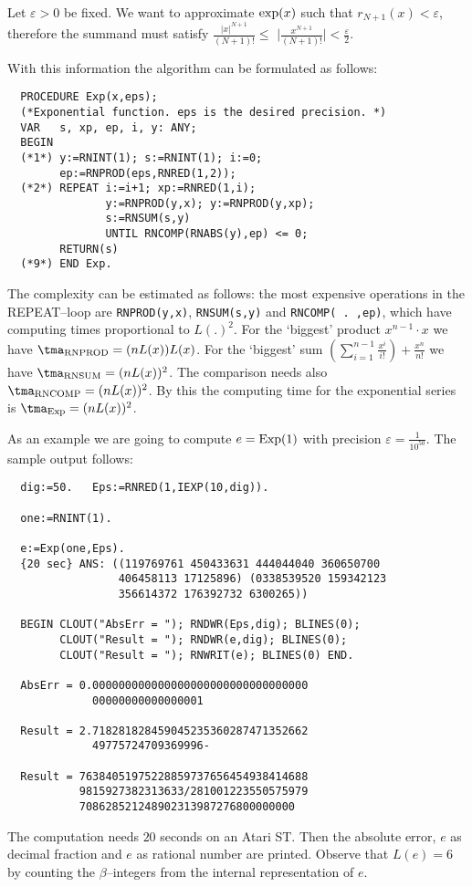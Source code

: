 Let $\varepsilon > 0$ be fixed. We want to approximate 
${\rm exp}(x)$ such that $r_{N+1}(x) < \varepsilon$, therefore the
summand must satisfy 
$\frac{\vert x \vert^{N+1}}{(N+1) !} \leq $
$\vert \frac{x^{N+1}}{(N+1) !} \vert < \frac{\varepsilon}{2}$.

With this information the algorithm can be formulated as follows:

\begin{verbatim}
  PROCEDURE Exp(x,eps);
  (*Exponential function. eps is the desired precision. *)
  VAR   s, xp, ep, i, y: ANY;
  BEGIN 
  (*1*) y:=RNINT(1); s:=RNINT(1); i:=0; 
        ep:=RNPROD(eps,RNRED(1,2));
  (*2*) REPEAT i:=i+1; xp:=RNRED(1,i);
               y:=RNPROD(y,x); y:=RNPROD(y,xp);
               s:=RNSUM(s,y)
               UNTIL RNCOMP(RNABS(y),ep) <= 0;
        RETURN(s)
  (*9*) END Exp.
\end{verbatim}
The complexity can be estimated as follows:
the most expensive operations in the REPEAT--loop
are \verb/RNPROD(y,x)/, \verb/RNSUM(s,y)/ and 
\verb/RNCOMP( . ,ep)/, which have 
computing times proportional to $L(.)^2$. 
For the `biggest' product $x^{n-1} \cdot x$
we have $\tma_{\rm RNPROD} = (n L(x)) L(x)$. 
For the `biggest' sum 
$(\sum_{i=1}^{n-1} \frac{x^i}{i !}) + \frac{x^n}{n !}$ 
we have $\tma_{\rm RNSUM} = (n L(x))^2$. 
The comparison needs also 
$\tma_{\rm RNCOMP} = (n L(x))^2$.
By this the computing time for the exponential series is 
$\tma_{\rm Exp} = (n L(x))^2$.

As an example we are going to compute $e = {\rm Exp}(1)$
with precision $\varepsilon = \frac{1}{10^{50}}$.
The sample output follows:
\begin{verbatim}
  dig:=50.   Eps:=RNRED(1,IEXP(10,dig)).

  one:=RNINT(1).

  e:=Exp(one,Eps).
  {20 sec} ANS: ((119769761 450433631 444044040 360650700 
                 406458113 17125896) (0338539520 159342123 
                 356614372 176392732 6300265))

  BEGIN CLOUT("AbsErr = "); RNDWR(Eps,dig); BLINES(0);     
        CLOUT("Result = "); RNDWR(e,dig); BLINES(0);
        CLOUT("Result = "); RNWRIT(e); BLINES(0) END. 
 
  AbsErr = 0.000000000000000000000000000000000
             00000000000000001
 
  Result = 2.718281828459045235360287471352662
             49775724709369996-
 
  Result = 76384051975228859737656454938414688
           9815927382313633/281001223550575979
           708628521248902313987276800000000
\end{verbatim}
The computation needs $20$ seconds on an Atari ST.
Then the absolute error, 
$e$ as decimal fraction and $e$ as rational number 
are printed. 
Observe that $L(e) = 6$ by counting the $\beta$--integers
from the internal representation of $e$.

